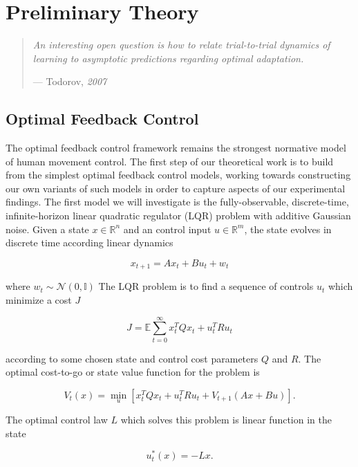 \documentclass[
  a4paper,
]{article}
\begin{document}
\hypertarget{sec:theory}{%
\section{Preliminary Theory}\label{sec:theory}}

\begin{quote}
\emph{An interesting open question is how to relate trial-to-trial
dynamics of learning to asymptotic predictions regarding optimal
adaptation.}

--- Todorov, \emph{2007}
\end{quote}

\hypertarget{optimal-feedback-control}{%
\subsection{Optimal Feedback Control}\label{optimal-feedback-control}}

The optimal feedback control framework remains the strongest normative
model of human movement control. The first step of our theoretical work
is to build from the simplest optimal feedback control models, working
towards constructing our own variants of such models in order to capture
aspects of our experimental findings. The first model we will
investigate is the fully-observable, discrete-time, infinite-horizon
linear quadratic regulator (LQR) problem with additive Gaussian noise.
Given a state \(x\in{\mathbb{R}^n}\) and an control input
\(u\in{\mathbb{R}^m}\), the state evolves in discrete time according
linear dynamics

\[
x_{t+1} = Ax_t + Bu_t + w_t
\]

where \(w_t\sim\mathcal{N}(0,\mathbb{I})\) The LQR problem is to find a
sequence of controls \(u_t\) which minimize a cost \(J\)

\[
J = \mathbb{E}\sum_{t=0}^{\infty}{x_t^TQx_t + u_t^TRu_t}
\]

according to some chosen state and control cost parameters \(Q\) and
\(R\). The optimal cost-to-go or state value function for the problem is

\[
V_t(x) = \min_{u}\left[{x_t^TQx_t + u_t^TRu_t + V_{t+1}(Ax+Bu)}\right].
\]

The optimal control law \(L\) which solves this problem is linear
function in the state

\[
u_t^*(x) = -Lx.
\]
\end{document}
